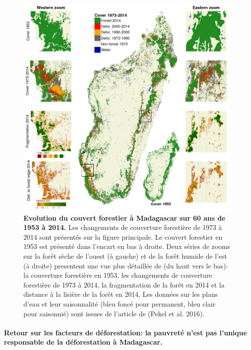 \documentclass[12pt,]{article}
\let\oldparagraph\paragraph
\renewcommand{\paragraph}[1]{\oldparagraph{#1}\mbox{}}
\begin{document}
\begin{figure}[H]

{\centering \includegraphics[width=\textwidth]{figures/fig_fcc} 

}

\caption{\textbf{Evolution du couvert forestier à Madagascar sur 60
ans de 1953 à 2014.} Les changements de couverture forestière de 1973 à
2014 sont présentés sur la figure principale. Le couvert forestier en
1953 est présenté dans l'encart en bas à droite. Deux séries de zooms
sur la forêt sèche de l'ouest (à gauche) et de la forêt humide de l'est
(à droite) presentent une vue plus détaillée de (du haut vers le bas):
la couverture forestière en 1953, les changements de couverture
forestière de 1973 à 2014, la fragmentation de la forêt en 2014 et la
distance à la lisière de la forêt en 2014. Les données sur les plans
d'eau et leur saisonnalité (bleu foncé pour permanent, bleu clair pour
saisonnié) sont issues de l'article de (Pekel et al. 2016).}\label{fig:fcc}
\end{figure}

\hypertarget{retour-sur-les-facteurs-de-deforestation-la-pauvrete-nest-pas-lunique-responsable-de-la-deforestation-a-madagascar.-1}{%
\paragraph{Retour sur les facteurs de déforestation: la pauvreté n'est
pas l'unique responsable de la déforestation à
Madagascar.}\label{retour-sur-les-facteurs-de-deforestation-la-pauvrete-nest-pas-lunique-responsable-de-la-deforestation-a-madagascar.-1}}
\end{document}
